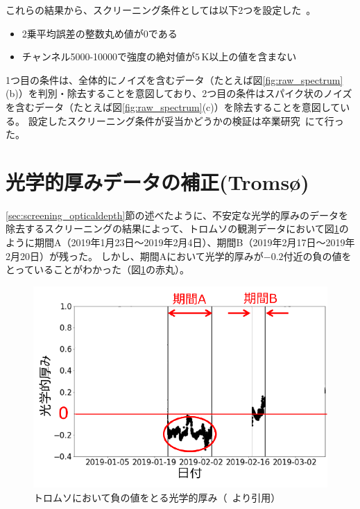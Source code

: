 これらの結果から、スクリーニング条件としては以下2つを設定した~\cite{goto2021bachelor}。
\begin{itemize}
    \item 2乗平均誤差の整数丸め値が0である
    \item チャンネル5000-10000で強度の絶対値が$5\, \mathrm{K}$以上の値を含まない
\end{itemize} \par
1つ目の条件は、全体的にノイズを含むデータ（たとえば図\ref{fig:raw_spectrum}(b)）を判別・除去することを意図しており、2つ目の条件はスパイク状のノイズを含むデータ（たとえば図\ref{fig:raw_spectrum}(c)）を除去することを意図している。
設定したスクリーニング条件が妥当かどうかの検証は卒業研究~\cite{goto2021bachelor}にて行った。


\section{光学的厚みデータの補正(Troms\o)}
\label{sec:correction_opticaldepth}
\ref{sec:screening_opticaldepth}節の述べたように、不安定な光学的厚みのデータを除去するスクリーニングの結果によって、トロムソの観測データにおいて図\ref{fig:optical_depth_minus}のように期間A（2019年1月23日〜2019年2月4日）、期間B（2019年2月17日〜2019年2月20日）が残った。
しかし、期間Aにおいて光学的厚みが$-0.2$付近の負の値をとっていることがわかった（図\ref{fig:optical_depth_minus}の赤丸）。
\begin{figure}[htbp]
    \centering
    \includegraphics[width=\linewidth]{master_thesis_contents/master_thesis_fig/optical_depth_minus.pdf}
    \caption{トロムソにおいて負の値をとる光学的厚み（~\cite{goto2021bachelor}より引用）}
    \label{fig:optical_depth_minus}
\end{figure}
